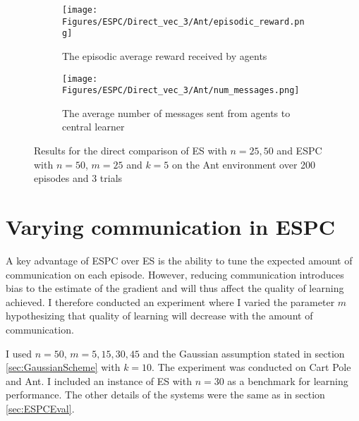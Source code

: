 \begin{figure}[H]
    \centering
    \begin{subfigure}{0.4\textwidth}
        \centering
        \texttt{[image: Figures/ESPC/Direct\_vec\_3/Ant/episodic\_reward.png]}
        \caption{The episodic average reward received by agents}
        \label{fig:AntEpisodicReward}
    \end{subfigure}
    \begin{subfigure}{0.4\textwidth}
        \centering
        \texttt{[image: Figures/ESPC/Direct\_vec\_3/Ant/num\_messages.png]}
        \caption{The average number of messages sent from agents to central learner}
        \label{fig:AntMessages}
    \end{subfigure}
    \caption{Results for the direct comparison of ES with $n=25,50$ and ESPC with $n=50$, $m=25$ and $k=5$ on the Ant environment over 200 episodes and 3 trials}
    \label{fig:DirectAnt}
\end{figure}


\section{Varying communication in ESPC}
A key advantage of ESPC over ES is the ability to tune the expected amount of communication on each episode. However, reducing communication introduces bias to the estimate of the gradient and will thus affect the quality of learning achieved. I therefore conducted an experiment where I varied the parameter $m$ hypothesizing that quality of learning will decrease with the amount of communication.

I used $n=50$, $m=5,15,30,45$ and the Gaussian assumption stated in section \ref{sec:GaussianScheme} with $k=10$. The experiment was conducted on Cart Pole and Ant. I included an instance of ES with $n=30$ as a benchmark for learning performance. The other details of the systems were the same as in section \ref{sec:ESPCEval}.

